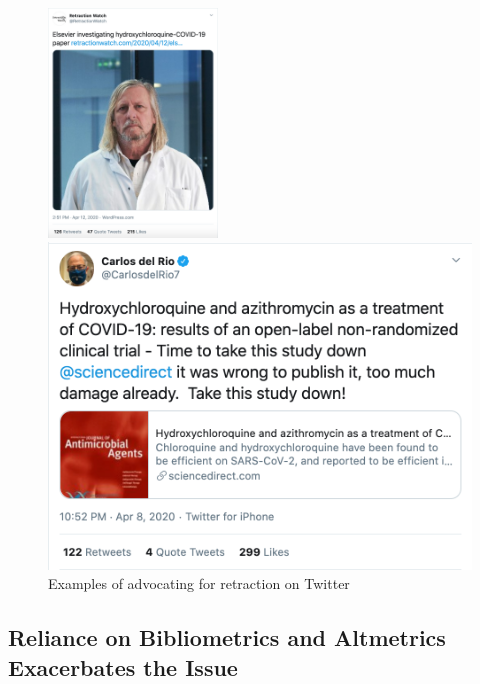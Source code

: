 \documentclass[acmsmall,authordraft]{acmart}
\begin{document}
\begin{figure}
\centering
\parbox{5cm}{
\includegraphics[width=0.4\textwidth]{Pictures/retraction watch tweet.png}
}
\qquad
\begin{minipage}{5cm}
\includegraphics[width=1.2\textwidth]{Pictures/carlos tweet.png}
\end{minipage}
 \caption{Examples of advocating for retraction on Twitter \citep{Retract2010twitter, Carlos2020twitter}}
 \label{Retraction_Tweets}
\end{figure}


\subsection{Reliance on Bibliometrics and Altmetrics Exacerbates the Issue}
\label{Reliance on bibliometrics and altmetrics exacerbates the issue}
\end{document}

